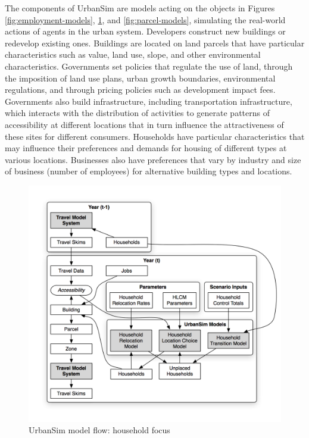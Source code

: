 The components of UrbanSim are models acting on the objects in Figures \ref{fig:employment-models}, \ref{fig:household-models}, and \ref{fig:parcel-models}, simulating the real-world actions of agents in the urban system. Developers construct new buildings or redevelop existing ones. Buildings are located on land parcels that have particular characteristics such as value, land use, slope, and other environmental characteristics. Governments set policies that regulate the use of land, through the imposition of land use plans, urban growth boundaries, environmental regulations, and through pricing policies such as development impact fees. Governments also build infrastructure, including transportation infrastructure, which interacts with the distribution of activities to generate patterns of accessibility at different locations that in turn influence the attractiveness of these sites for different consumers. Households have particular characteristics that may influence their preferences and demands for housing of different types at various locations. Businesses also have preferences that vary by industry and size of business (number of employees) for alternative building types and locations.

\begin{figure}[ht]
    \center
    \includegraphics[width=\textwidth]{graphics/ParcelHouseholdModel.png}
    \caption{UrbanSim model flow: household focus}
    \label{fig:household-models}
\end{figure}

